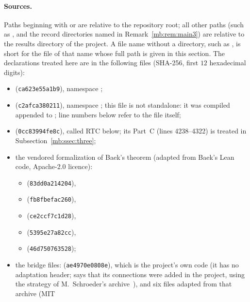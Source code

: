 \paragraph{Sources.}
Paths beginning with  or  are relative to the repository root; all other paths (such
as ,  and the record directories named in Remark~\ref{mb:rem:main3}) are relative
to the results directory of the project. A file name without a directory, such as , is short for
the file of that name whose full path is given in this section. The declarations treated here are in the following
files (SHA-256, first $12$ hexadecimal digits):
\begin{itemize}
\item {} (\texttt{ca623e55a1b9}), namespace ;
\item {} (\texttt{c2afca380211}), namespace ; this file is not
  standalone: it was compiled appended to ; line numbers below refer to the file itself;
\item {} (\texttt{0cc83994fe8c}), called RTC below; its Part~C (lines
  4238--4322) is treated in Subsection~\ref{mb:ssec:three};
\item the vendored formalization of Baek's theorem (adapted from Baek's Lean code, Apache-2.0 licence):
  \begin{itemize}
  \item {} (\texttt{83dd0a214204}),
  \item {} (\texttt{fb8fbefac260}),
  \item {} (\texttt{ce2ccf7c1d28}),
  \item {} (\texttt{5395e27a82cc}),
  \item {} (\texttt{46d750763528});
  \end{itemize}
\item the bridge files:  (\texttt{ae4970e0808e}), which is the project's
  own code (it has no adaptation header;  says that its connections were added in the
  project, using the strategy of M.~Schroeder's archive~\cite{Sch26}), and six files adapted from that archive (MIT

\end{itemize}
